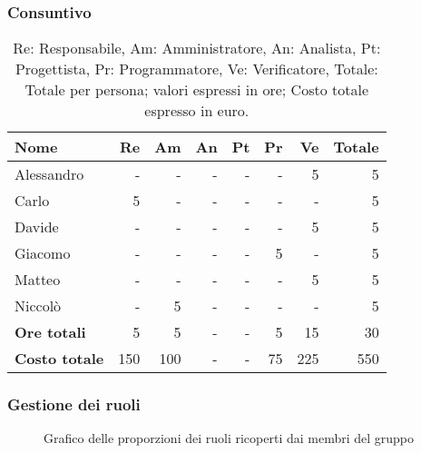 \subsubsection{Consuntivo}
\begin{table}[H]
	\centering
	\begin{tabular}{l|r|r|r|r|r|r|r}
		\textbf{Nome}         & \textbf{Re} & \textbf{Am} & \textbf{An} & \textbf{Pt} & \textbf{Pr} & \textbf{Ve} & \textbf{Totale} \\
		\hline
		Alessandro            & -           & -           & -           & -           & -           & 5           & 5               \\
		Carlo                 & 5           & -           & -           & -           & -           & -           & 5               \\
		Davide                & -           & -           & -           & -           & -           & 5           & 5               \\
		Giacomo               & -           & -           & -           & -           & 5           & -           & 5              \\
		Matteo                & -           & -           & -           & -           & -           & 5           & 5               \\
		Niccolò               & -           & 5           & -           & -           & -           & -           & 5               \\
		\hline
		\textbf{Ore totali}   & 5           & 5           & -           & -           & 5           & 15          & 30              \\
		\textbf{Costo totale} & 150         & 100         & -           & -           & 75          & 225         & 550
	\end{tabular}
	\caption{Re: Responsabile, Am: Amministratore, An: Analista, Pt: Progettista,
		Pr: Programmatore, Ve: Verificatore, Totale: Totale per persona; valori espressi in ore; Costo totale espresso in euro.}
\end{table}

\subsubsection{Gestione dei ruoli}
\begin{figure}[h]
	\centering
	\caption{Grafico delle proporzioni dei ruoli ricoperti dai membri del gruppo}
\end{figure}

